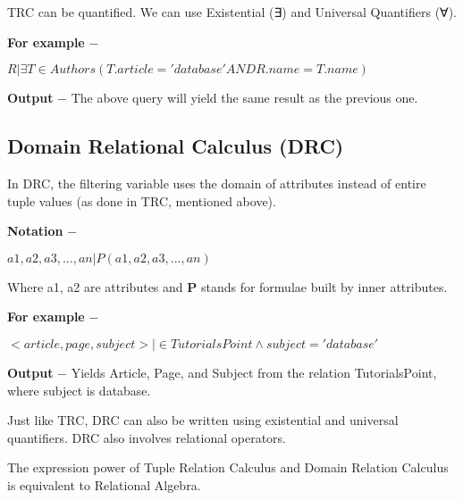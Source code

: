 \documentclass[]{article}
\begin{document}
TRC can be quantified. We can use Existential (∃) and Universal
Quantifiers (∀).

\textbf{For example} −

\({ R| ∃T ∈ Authors(T.article='database' AND R.name=T.name)}\)

\textbf{Output} − The above query will yield the same result as the
previous one.

\hypertarget{domain-relational-calculus-drc}{%
\subsection{Domain Relational Calculus
(DRC)}\label{domain-relational-calculus-drc}}

In DRC, the filtering variable uses the domain of attributes instead of
entire tuple values (as done in TRC, mentioned above).

\textbf{Notation} −

\({ a1, a2, a3, ..., an | P (a1, a2, a3, ... ,an)}\)

Where a1, a2 are attributes and \textbf{P} stands for formulae built by
inner attributes.

\textbf{For example} −

\({< article, page, subject > | ∈ TutorialsPoint ∧ subject = 'database'}\)

\textbf{Output} − Yields Article, Page, and Subject from the relation
TutorialsPoint, where subject is database.

Just like TRC, DRC can also be written using existential and universal
quantifiers. DRC also involves relational operators.

The expression power of Tuple Relation Calculus and Domain Relation
Calculus is equivalent to Relational Algebra.
\end{document}
